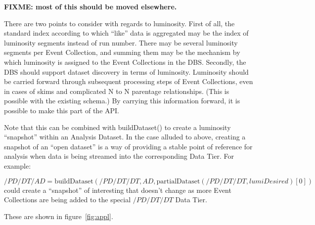 {\bf FIXME: most of this should be moved elsewhere.}

  There are two points to consider with regards to luminosity.  First of
all, the standard index according to which ``like'' data is aggregated may
be the index of luminosity segments instead of run number.  There may be
several luminosity segments per Event Collection, and summing them may be
the mechanism by which luminosity is assigned to the Event Collections
in the DBS.   Secondly, the DBS should support dataset discovery in
terms of luminosity.  Luminosity should be carried forward through
subsequent processing steps of Event Collections, even in cases of
skims and complicated N to N parentage relationships.  (This is possible
with the existing schema.)  By carrying this information forward, it is
possible to make this part of the API.

Note that this can be combined with buildDataset() to create a luminosity
``snapshot'' within an Analysis Dataset.  In the case alluded to above,
creating a snapshot of an ``open dataset'' is a way of providing a stable
point of reference for analysis when data is being streamed into the
corresponding Data Tier. For example:

\begin{equation}
   /PD/DT/AD = \mbox{buildDataset} ( /PD/DT/DT, AD, \mbox{partialDataset} ( /PD/DT/DT, lumiDesired )[0] )
\end{equation}
could create a ``snapshot'' of interesting that doesn't change as more Event 
Collections are being added to the special $/PD/DT/DT$ Data Tier.


These are shown in figure~\ref{fig:appl}.

